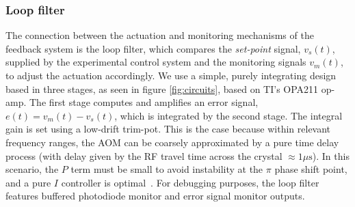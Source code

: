 \documentclass[twocolumn,aps,pra,showpacs,preprintnumbers,bibnotes]{revtex4-1}
\begin{document}
\subsubsection{Loop filter}

The connection between the actuation and monitoring mechanisms of the feedback system is the loop filter, which compares the \textit{set-point} signal, $v_s(t)$, supplied by the experimental control system and the monitoring signals $v_m(t)$, to adjust the actuation accordingly.
We use a simple, purely integrating design based in three stages, as seen in figure \ref{fig:circuits}, based on TI's OPA211 op-amp.
The first stage computes and amplifies an error signal, $e(t)=v_m(t)-v_s(t)$, which is integrated by the second stage. 
The integral gain is set using a low-drift trim-pot. 
This is the case because within relevant frequency ranges, the AOM can be coarsely approximated by a pure time delay process (with delay given by the RF travel time across the crystal $\approx 1 \mu\mathrm{s}$).
In this scenario, the $P$ term must be small to avoid instability at the $\pi$ phase shift point, and a pure $I$ controller is optimal~\cite{Skogestad2001}.
For debugging purposes, the loop filter features buffered photodiode monitor and error signal monitor outputs.
\end{document}
